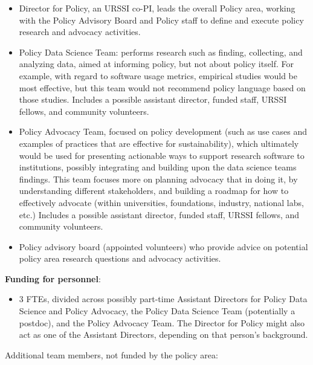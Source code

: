 \documentclass[
]{book}
\providecommand{\tightlist}{%
  \setlength{\itemsep}{0pt}\setlength{\parskip}{0pt}}
\begin{document}
\begin{itemize}
\item
  Director for Policy, an URSSI co-PI, leads the overall Policy area, working with the
  Policy Advisory Board and Policy staff to define and execute policy research and advocacy activities.
\item
  Policy Data Science Team: performs research such as finding, collecting, and analyzing data,
  aimed at informing policy, but not about policy
  itself. For example, with regard to software usage metrics, empirical studies would be most effective,
  but this team would not recommend policy language based on those studies.
  Includes a possible assistant director, funded staff, URSSI fellows, and community volunteers.
\item
  Policy Advocacy Team, focused on policy development (such as use cases and examples of practices
  that are effective for sustainability), which ultimately would be used for presenting actionable ways
  to support research software to institutions, possibly integrating and building upon the data science
  teams findings. This team focuses more on planning advocacy that in doing it,
  by understanding different stakeholders, and building a roadmap for how to effectively advocate
  (within universities, foundations, industry, national labs, etc.)
  Includes a possible assistant director, funded staff, URSSI fellows, and community volunteers.
\item
  Policy advisory board (appointed volunteers) who provide advice on potential policy area
  research questions and advocacy activities.
\end{itemize}

\textbf{Funding for personnel}:

\begin{itemize}
\tightlist
\item
  3 FTEs, divided across possibly part-time Assistant Directors for Policy Data Science and Policy Advocacy,
  the Policy Data Science Team (potentially a postdoc), and the Policy Advocacy Team.
  The Director for Policy might also act as one of the Assistant Directors, depending on that person's background.
\end{itemize}

Additional team members, not funded by the policy area:
\end{document}
